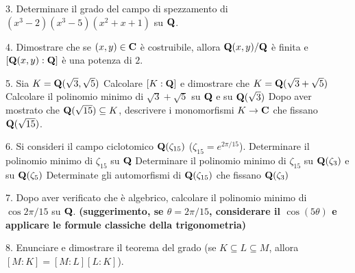 \item{3.} Determinare il grado del campo di spezzamento di $(x^3-2)(x^3-5)(x^2+x+1)$ su ${\bf Q}$.\vv


\item{4.} Dimostrare che se $(x,y)\in{\bf C}$ \`e costruibile, allora ${\bf Q}(x,y)/{\bf Q}$ \`e finita e $[{\bf Q}(x,y):{\bf Q}]$ \`e una potenza di $2$.\ve\ \vs

\item{5.} Sia $K={\bf Q}(\sqrt3,\sqrt5)$
 Calcolare $[K:{\bf Q}]$ e dimostrare che $K={\bf Q}(\sqrt3+\sqrt5)$
 Calcolare il polinomio minimo di $\sqrt3+\sqrt5$ su ${\bf Q}$ e
su ${\bf Q}(\sqrt3)$
 Dopo aver mostrato che ${\bf Q}(\sqrt{15})\subseteq K$, descrivere i monomorfismi $K\rightarrow {\bf C}$ che fissano ${\bf Q}(\sqrt{15})$. 
\vv


\item{6.} Si consideri il campo ciclotomico ${\bf Q}(\zeta_{15})$ ($\zeta_{15}=e^{2\pi/15}$).
 Determinare il polinomio minimo di $\zeta_{15}$ su ${\bf Q}$
 Determinare il polinomio minimo di $\zeta_{15}$ su ${\bf Q}(\zeta_3)$ e su ${\bf Q}(\zeta_5)$
 Determinate gli automorfismi di ${\bf Q}(\zeta_{15})$ che fissano ${\bf Q}(\zeta_3)$\ve\ \vs

\item{7.} Dopo aver verificato che \`e algebrico, calcolare il polinomio minimo di $\cos2\pi/15$ su ${\bf Q}$. \bf(suggerimento, se $\theta=2\pi/15$, considerare il $\cos(5\theta)$ e applicare le formule classiche della trigonometria)\rm 
\vv

\item{8.} Enunciare e dimostrare il teorema del grado (se $K\subseteq L\subseteq M$, allora $[M:K]=[M:L][L:K]$).
\ve

 \bye
